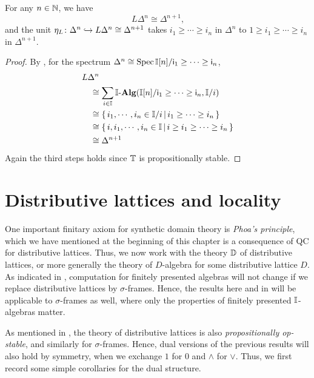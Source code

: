 \begin{corollary}[\AxiomSQCI]
  For any $n\in\mathbb{N}$, we have
  \[ L\Delta^n \cong \Delta^{n+1}\text{,} \]
  and the unit $\eta_L \colon \Delta^n \hookrightarrow L\Delta^n \cong \Delta^{n+1}$ takes $i_1 \ge \cdots \ge i_n$ in $\Delta^n$ to $1 \ge i_1 \ge \cdots \ge i_n$ in $\Delta^{n+1}$. 
\end{corollary}
\begin{proof}
  By , for the spectrum $\Delta^n \cong \operatorname{Spec}\mathbb{I}[n]/\mathsf{i}_1 \ge \cdots \ge \mathsf{i}_n$,
  \begin{align*}
    & L\Delta^n \\
    &\quad\cong \sum_{i \in \mathbb{I}}\mathbb{I}\text{-}\mathbf{Alg}(\mathbb{I}[n]/\mathsf{i}_1\ge\cdots\ge \mathsf{i}_n,\mathbb{I}/i) \\
    &\quad\cong \left\{\,i_1,\cdots,i_n\in\mathbb{I}/i\,\middle|\,i_1 \ge \cdots \ge i_n\,\right\} \\
    &\quad\cong \left\{\,i,i_1,\cdots,i_n\in\mathbb{I}\,\middle|\,i \ge i_1 \ge \cdots \ge i_n\,\right\} \\
    &\quad\cong \Delta^{n+1}
  \end{align*}
  Again the third steps holds since $\mathbb{T}$ is propositionally stable.
\end{proof}

\section{Distributive lattices and locality}\label{sec:locality}

One important finitary axiom for synthetic domain theory is \emph{Phoa's principle}, which we have mentioned at the beginning of this chapter is a consequence of \gls{QC} for distributive lattices. Thus, we now work with the theory $\mathbb{D}$ of distributive lattices, or more generally the theory of $D$-algebra for some distributive lattice $D$. As indicated in , computation for finitely presented algebras will not change if we replace distributive lattices by $\sigma$-frames. Hence, the results here and in  will be applicable to $\sigma$-frames as well, where only the properties of finitely presented $\mathbb{I}$-algebras matter.

As mentioned in , the theory of distributive lattices is also \emph{propositionally op-stable}, and similarly for $\sigma$-frames. Hence, dual versions of the previous results will also hold by symmetry, when we exchange $1$ for $0$ and $\wedge$ for $\vee$. Thus, we first record some simple corollaries for the dual structure.

